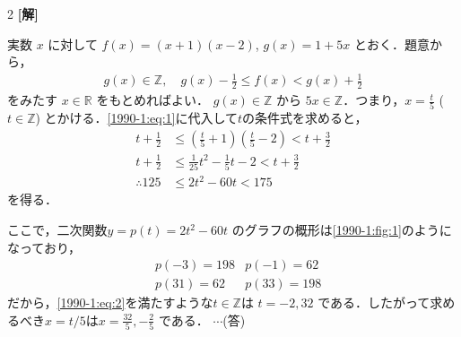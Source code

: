 \documentclass[../../main.tex]{subfiles}
\begin{document}
\setcounter{equation}{0}
\setcounter{figure}{0}
\setcounter{table}{0}
\begin{oframed}
    
\end{oframed}
\setlength{\columnseprule}{0.4pt}
\begin{multicols}{2}
    {\bf[解]}

    実数 $x$ に対して $f(x) = (x+1)(x-2)$, $g(x) = 1+5x$ とおく．題意から，
    \begin{align}\label{1990-1:eq:1}
        g(x) \in \mathbb{Z}, \quad g(x) - \frac{1}{2} \le f(x) < g(x) + \frac{1}{2}
    \end{align}
    をみたす $x \in \mathbb{R}$ をもとめればよい．
    $g(x) \in \mathbb{Z}$ から $5x \in \mathbb{Z}$．つまり，$x = \frac{t}{5}$ ($t \in \mathbb{Z}$)
    とかける．\cref{1990-1:eq:1}に代入して$t$の条件式を求めると，
    \begin{align}
        t + \frac{1}{2} & \le \left(\frac{t}{5}+1\right)\left(\frac{t}{5}-2\right) < t+\frac{3}{2} \nonumber \\
        t + \frac{1}{2} & \le \frac{1}{25}t^2  - \frac{1}{5}t - 2 < t+\frac{3}{2} \nonumber                  \\
        \therefore 125  & \le 2t^2 - 60t < 175 \label{1990-1:eq:2}
    \end{align}
    を得る．

    ここで，二次関数$y = p(t) = 2t^2 - 60t$ のグラフの概形は\cref{1990-1:fig:1}のようになっており，
    \begin{align*}
         & p(-3) = 198 & p(-1) = 62  \\
         & p(31) = 62  & p(33) = 198
    \end{align*}
    だから，\cref{1990-1:eq:2}を満たすような$t \in \mathbb{Z}$は $t=-2, 32$ である．したがって求めるべき$x=t/5$は$x = \frac{32}{5}, -\frac{2}{5}$ である． $\cdots$(答)

    \begin{figure}[H]
        \centering
        \def\yBoundaryLower{125}
        \def\yBoundaryUpper{175}
        \def\yAtIntPoints{128} %




\end{figure}
\end{multicols}
\end{document}
